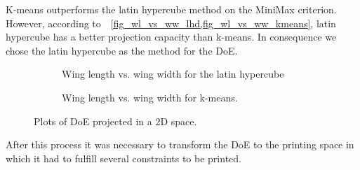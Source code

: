 K-means outperforms the latin hypercube method on the MiniMax criterion.
However, according to~~\cref{fig_wl_vs_ww_lhd,fig_wl_vs_ww_kmeans}, latin
hypercube has a better projection capacity than k-means. In consequence  we
chose the latin hypercube as the method for the DoE.

\begin{figure}
	\begin{subfigure}[h]{.5\linewidth}
		
		\caption{Wing length vs. wing width for the latin hypercube}
		\label{fig_wl_vs_ww_lhd}
	\end{subfigure}
	\begin{subfigure}[h]{.5\linewidth}
		
		\caption{Wing length vs. wing width for k-means.}
		\label{fig_wl_vs_ww_kmeans}
	\end{subfigure}
	\caption{Plots of DoE projected in a 2D space.}
\end{figure}

After this process it was necessary to transform the DoE to the printing space
in which it had to fulfill several constraints to be printed.